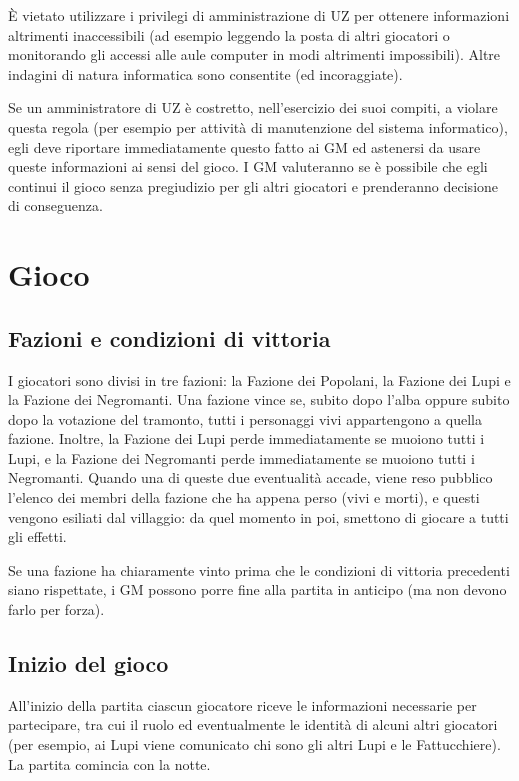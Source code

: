 \documentclass[a4paper,10pt]{article}
\begin{document}
È vietato utilizzare i privilegi di amministrazione di UZ per ottenere informazioni altrimenti inaccessibili
(ad esempio leggendo la posta di altri giocatori o monitorando gli accessi alle aule computer in modi altrimenti impossibili).
Altre indagini di natura informatica sono consentite (ed incoraggiate).

Se un amministratore di UZ è costretto, nell'esercizio dei suoi
compiti, a violare questa regola (per esempio per attività di
manutenzione del sistema informatico), egli deve riportare
immediatamente questo fatto ai GM ed astenersi da usare queste
informazioni ai sensi del gioco. I GM valuteranno se è possibile che
egli continui il gioco senza pregiudizio per gli altri giocatori e
prenderanno decisione di conseguenza.


\pagebreak
\section{Gioco}

\subsection{Fazioni e condizioni di vittoria}

I giocatori sono divisi in tre fazioni: la Fazione dei Popolani, la Fazione dei
Lupi e la Fazione dei Negromanti.
Una fazione vince se, subito dopo l'alba oppure subito dopo la votazione del
tramonto, tutti i personaggi vivi appartengono a quella fazione.
Inoltre, la Fazione dei Lupi perde immediatamente se muoiono tutti i Lupi, e la
Fazione dei Negromanti perde immediatamente se muoiono tutti i Negromanti.
Quando una di queste due eventualità accade, viene reso pubblico l'elenco dei
membri della fazione che ha appena perso (vivi e morti), e questi vengono
esiliati dal villaggio: da quel momento in poi, smettono di giocare a tutti gli
effetti.

Se una fazione ha chiaramente vinto prima che le condizioni di vittoria
precedenti siano rispettate, i GM possono porre fine alla partita in anticipo
(ma non devono farlo per forza).

\subsection{Inizio del gioco}

All'inizio della partita ciascun giocatore riceve le informazioni necessarie per partecipare,
tra cui il ruolo ed eventualmente le identità di alcuni altri giocatori (per esempio, ai Lupi viene
comunicato chi sono gli altri Lupi e le Fattucchiere).
La partita comincia con la notte.
\end{document}
